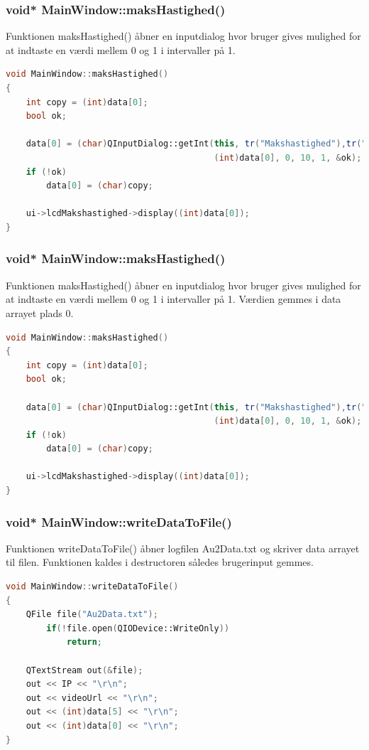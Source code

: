 \subsubsection{void* MainWindow::maksHastighed()}
Funktionen maksHastighed() åbner en inputdialog hvor bruger gives mulighed for at indtaste en værdi mellem 0 og 1 i intervaller på 1.  
\begin{lstlisting}[caption={maksHastighed},label=lst:maksHastighed, language=c++]
void MainWindow::maksHastighed()
{
    int copy = (int)data[0];
    bool ok;

    data[0] = (char)QInputDialog::getInt(this, tr("Makshastighed"),tr("Indtast makshastigheden"),
                                         (int)data[0], 0, 10, 1, &ok);
    if (!ok)
        data[0] = (char)copy;

    ui->lcdMakshastighed->display((int)data[0]);
}
\end{lstlisting}

\subsubsection{void* MainWindow::maksHastighed()}
Funktionen maksHastighed() åbner en inputdialog hvor bruger gives mulighed for at indtaste en værdi mellem 0 og 1 i intervaller på 1. Værdien gemmes i data arrayet plads 0.  
\begin{lstlisting}[caption={maksHastighed},label=lst:maksHastighed, language=c++]
void MainWindow::maksHastighed()
{
    int copy = (int)data[0];
    bool ok;

    data[0] = (char)QInputDialog::getInt(this, tr("Makshastighed"),tr("Indtast makshastigheden"),
                                         (int)data[0], 0, 10, 1, &ok);
    if (!ok)
        data[0] = (char)copy;

    ui->lcdMakshastighed->display((int)data[0]);
}
\end{lstlisting}

\subsubsection{void* MainWindow::writeDataToFile()}
Funktionen writeDataToFile() åbner logfilen Au2Data.txt og skriver data arrayet til filen. Funktionen kaldes i destructoren således brugerinput gemmes. 
\begin{lstlisting}[caption={writeDataToFile},label=lst:writeDataToFile, language=c++]
void MainWindow::writeDataToFile()
{
    QFile file("Au2Data.txt");
        if(!file.open(QIODevice::WriteOnly))
            return;

    QTextStream out(&file);
    out << IP << "\r\n";
    out << videoUrl << "\r\n";
    out << (int)data[5] << "\r\n";
    out << (int)data[0] << "\r\n";
}
\end{lstlisting}

